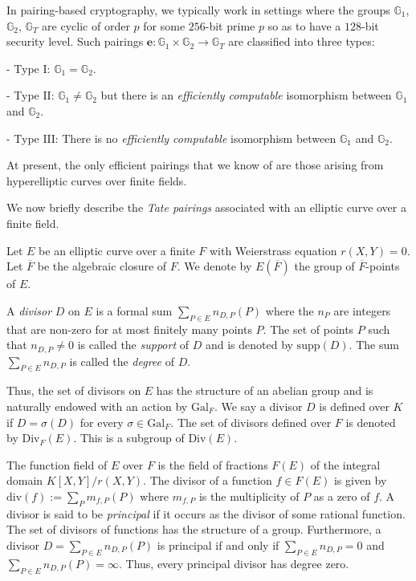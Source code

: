 \documentclass[11pt, lettersize, notitlepage, leqno, footskip=0.6cm]{article}
\newcommand{\slim}{\sum\limits}
\newcommand{\absf}{\mathrm{Gal}_F}
\newcommand{\divv}{\mathrm{div}}
\newcommand{\lra}{\longrightarrow}
\newcommand{\mb}{\mathbb}
\newcommand{\mr}{\mathrm}
\newcommand{\ov}{\overline}
\numberwithin{equation}{section}
\begin{document}
In pairing-based cryptography, we typically work in settings where the groups $\mb{G}_1$, $\mb{G}_2$, $\mb{G}_T$ are cyclic of order $p$ for some $256$-bit prime $p$ so as to have a $128$-bit security level. Such pairings $\mathbf{e}:\mb{G}_1\times \mb{G}_2 \lra \mb{G}_T$ are classified into three types:

\noindent - Type $\mr{I}$: $\mb{G}_1 = \mb{G}_2$.

\noindent - Type $\mr{II}$: $\mb{G}_1 \neq \mb{G}_2$ but there is an \textit{efficiently computable} isomorphism between $\mb{G}_1$ and $\mb{G}_2$.

\noindent - Type $\mr{III}$: There is no \textit{efficiently computable} isomorphism between $\mb{G}_1$ and $\mb{G}_2$.

At present, the only efficient pairings that we know of are those arising from hyperelliptic curves over finite fields. 

We now briefly describe the \textit{Tate pairings} associated with an elliptic curve over a finite field. 

Let $E$ be an elliptic curve over a finite $F$ with Weierstrass equation $r(X,Y) = 0$. Let $\ov{F}$ be the algebraic closure of $F$. We denote by $E(\ov{F})$ the group of $\ov{F}$-points of $E$. 

A \textit{divisor} $D$ on $E$ is a formal sum $\slim_{P\in E}n_{D,P}(P) $ where the $n_P$ are integers that are non-zero for at most finitely many points $P$. The set of points $P$ such that $n_{D,P}\neq 0$ is called the \textit{support} of $D$ and is denoted by $\mr{supp}(D)$. The sum $\slim_{P\in E}n_{D,P}$ is called the \textit{degree} of $D$. 

Thus, the set of divisors on $E$ has the structure of an abelian group and is naturally endowed with an action by $\absf$. We say a divisor $D$ is defined over $K$ if $D = \sigma(D)$ for every $\sigma\in \absf$. The set of divisors defined over $F$ is denoted by $\mr{Div}_F(E)$. This is a subgroup of $\mr{Div}(E)$.

The function field of $E$ over $F$ is the field of fractions $F(E)$ of the integral domain $K[X,Y]/r(X,Y).$ The divisor of a function $f\in F(E)$ is given by $\divv(f):= \slim_{P} m_{f,P}(P)$ where $m_{f,P}$ is the multiplicity of $P$ as a zero of $f$. A divisor is said to be \textit{principal} if it occurs as the divisor of some rational function. The set of divisors of functions has the structure of a group. Furthermore, a divisor $D= \slim_{P\in E}n_{D,P}(P)$ is principal if and only if $\slim_{P\in E}n_{D,P} = 0$ and $\slim_{P\in E}n_{D,P}(P) = \infty$. Thus, every principal divisor has degree zero. \\
\end{document}
